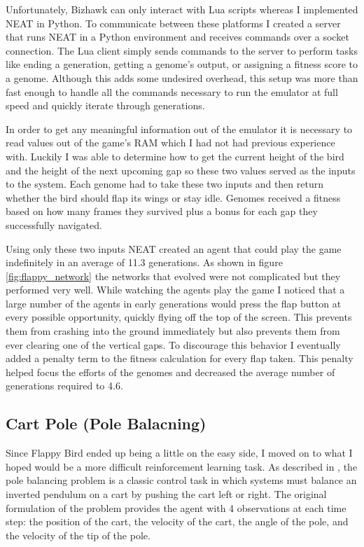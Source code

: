 \documentclass[twocolumn,letterpaper]{article}
\begin{document}
Unfortunately, Bizhawk
can only interact with Lua scripts whereas I implemented NEAT in Python. To communicate between these
platforms I created a server that runs NEAT in a Python environment and receives commands over a socket
connection. The Lua client simply sends commands to the server to perform tasks like ending a generation, getting a genome's output,
or assigning a fitness score to a genome. Although this adds some undesired overhead, this setup was more than fast enough to handle all the commands necessary to run the emulator at full speed and quickly iterate
through generations.

 In order to get any meaningful 
information out of the emulator it is necessary to read values out of the game's RAM which I had not had 
previous experience with. Luckily I was able to determine how to get the current height of the bird and
the height of the next upcoming gap so these two values served as the inputs to the system. Each genome
had to take these two inputs and then return whether the bird should flap its wings or stay idle. Genomes
received a fitness based on how many frames they survived plus a bonus for each gap they successfully 
navigated.

Using only these two inputs NEAT created an agent that could play the game indefinitely in an average of
11.3 generations. As shown in figure \ref{fig:flappy_network} the networks that evolved were not complicated
but they performed very well. While watching the agents play the game I noticed that a large number of the 
agents in early generations would press the flap button at every possible opportunity, quickly flying off the top of the
screen. This prevents them from crashing into the ground immediately but also prevents them from ever clearing
one of the vertical gaps. To discourage this behavior I eventually added a penalty term to the fitness
calculation for every flap taken. This penalty helped focus the efforts of the genomes and decreased the
average number of generations required to 4.6.  
 
\subsection{Cart Pole (Pole Balacning)}  \label{sec:pole}
Since Flappy Bird ended up being a little on the easy side, I moved on to what I hoped would be a more
difficult reinforcement learning task. As described in \cite{cartpole}, the pole balancing problem is a classic control task
in which systems must balance an inverted pendulum on a cart by pushing the cart left or right. The original
formulation of the problem provides the agent with 4 observations at each time step: the position of the
cart, the velocity of the cart, the angle of the pole, and the velocity of the tip of the pole. 
\end{document}
